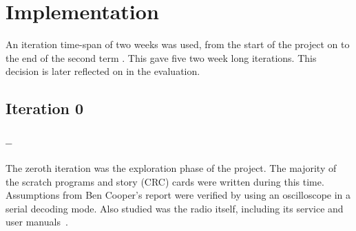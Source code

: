 \chapter{Implementation}





An iteration time-span of two weeks was used, from the start of the project on  to the end of the second term . This gave five two week long iterations. This decision is later reflected on in the evaluation.

\section{Iteration 0}
\subsection*{ -- }

The zeroth iteration was the exploration phase of the project. The majority of the scratch programs and story (CRC) cards were written during this time. Assumptions from Ben Cooper's report\cite{ben_report} were verified by using an oscilloscope in a serial decoding mode. Also studied was the radio itself, including its service and user manuals~\cite{user_manual}. 

